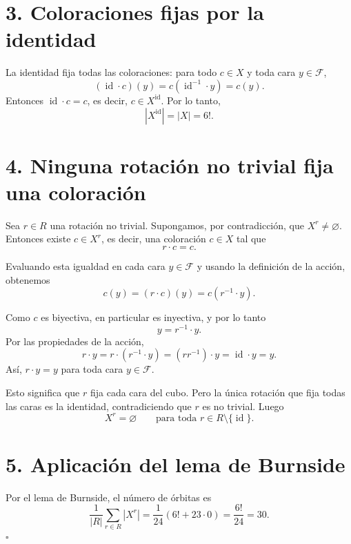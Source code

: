 \documentclass[11pt,a4paper]{article}
\begin{document}
\section*{3. Coloraciones fijas por la identidad}
La identidad fija todas las coloraciones: para todo $c\in X$ y toda cara $y\in\mathcal F$,
\[
(\operatorname{id}\cdot c)(y)
=c(\operatorname{id}^{-1}\cdot y)=c(y).
\]
Entonces $\operatorname{id}\cdot c=c$, es decir, $c\in X^{\operatorname{id}}$. Por lo tanto,
\[
|X^{\operatorname{id}}|=|X|=6!.
\]

\newpage
\section*{4. Ninguna rotación no trivial fija una coloración}
Sea $r\in R$ una rotación no trivial. Supongamos, por contradicción, que $X^r\neq\varnothing$. Entonces existe $c\in X^r$, es decir, una coloración $c\in X$ tal que
\[
r\cdot c=c.
\]

Evaluando esta igualdad en cada cara $y\in\mathcal F$ y usando la definición de la acción, obtenemos
\[
c(y)=(r\cdot c)(y)=c(r^{-1}\cdot y).
\]

Como $c$ es biyectiva, en particular es inyectiva, y por lo tanto
\[
y=r^{-1}\cdot y.
\]
Por las propiedades de la acción,
\[
r\cdot y=r\cdot(r^{-1}\cdot y)
=(rr^{-1})\cdot y=\operatorname{id}\cdot y=y.
\]
Así, $r\cdot y=y$ para toda cara $y\in\mathcal F$.

Esto significa que $r$ fija cada cara del cubo. Pero la única rotación que fija todas las caras es la identidad, contradiciendo que $r$ es no trivial. Luego
\[
X^r=\varnothing
\qquad\text{para toda }r\in R\setminus\{\operatorname{id}\}.
\]

\section*{5. Aplicación del lema de Burnside}
Por el lema de Burnside, el número de órbitas es
\[
\frac{1}{|R|}\sum_{r\in R}|X^r|
=\frac{1}{24}\left(6!+23\cdot0\right)
=\frac{6!}{24}
=\boxed{30}.
\]
\hfill$\square$
\end{document}
